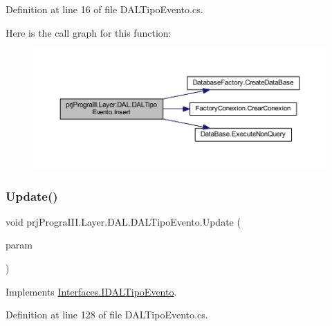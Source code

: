 Definition at line 16 of file D\+A\+L\+Tipo\+Evento.\+cs.

Here is the call graph for this function\+:
\nopagebreak
\begin{figure}[H]
\begin{center}
\leavevmode
\includegraphics[width=350pt]{classprj_progra_i_i_i_1_1_layer_1_1_d_a_l_1_1_d_a_l_tipo_evento_a890327fb7a414d8f67033f6036227418_cgraph}
\end{center}
\end{figure}
\hypertarget{classprj_progra_i_i_i_1_1_layer_1_1_d_a_l_1_1_d_a_l_tipo_evento_a1265817c512c688caab86130dd21b39a}{}\label{classprj_progra_i_i_i_1_1_layer_1_1_d_a_l_1_1_d_a_l_tipo_evento_a1265817c512c688caab86130dd21b39a} 
\subsubsection{\texorpdfstring{Update()}{Update()}}
{\footnotesize\ttfamily void prj\+Progra\+I\+I\+I.\+Layer.\+D\+A\+L.\+D\+A\+L\+Tipo\+Evento.\+Update (\begin{DoxyParamCaption}\item[{\hyperlink{classprj_progra_i_i_i_1_1_layer_1_1_entities_1_1_tipo_evento}{Tipo\+Evento}}]{param }\end{DoxyParamCaption})}



Implements \hyperlink{interface_interfaces_1_1_i_d_a_l_tipo_evento_a2aec87a149b0edd203803576be6946d0}{Interfaces.\+I\+D\+A\+L\+Tipo\+Evento}.



Definition at line 128 of file D\+A\+L\+Tipo\+Evento.\+cs.

